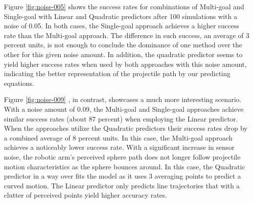\documentclass[letterpaper, 10 pt, conference]{ieeeconf}  %
\begin{document}
Figure \ref{fig:noise-005} shows the success rates for combinations of
Multi-goal and Single-goal with Linear and Quadratic predictors after
100 simulations with a noise of 0.05. In both cases, the Single-goal
approach achieves a higher success rate than the Multi-goal approach.
The difference in such success, an average of 3 percent units, is not
enough to conclude the dominance of one method over the other for this
given noise amount. In addition, the quadratic predictor seems to yield
higher success rates when used by both approaches with this noise
amount, indicating the better representation of the projectile path by
our predicting equations.

Figure \ref{fig:noise-009} , in contrast, showcases a much more
interesting scenario. With a noise amount of 0.09, the Multi-goal and
Single-goal approaches achieve similar success rates (about 87 percent)
when employing the Linear predictor. When the approaches utilize the
Quadratic predictors their success rates drop by a combined average of 8
percent units. In this case, the Multi-goal approach achieves a
noticeably lower success rate. With a significant increase in sensor
noise, the robotic arm's perceived sphere path does not longer follow
projectile motion characteristics as the sphere bounces around. In this
case, the Quadratic predictor in a way over fits the model as it uses 3
averaging points to predict a curved motion. The Linear predictor only
predicts line trajectories that with a clutter of perceived points yield
higher accuracy rates.
\end{document}
